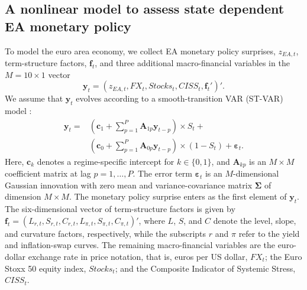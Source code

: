 \subsection{A nonlinear model to assess state dependent EA monetary policy}
To model the euro area economy, we collect EA monetary policy surprises, $z_{EA,t}$, term-structure factors, $\bm{f}_t$, and three additional macro-financial variables in the $M=10 \times 1$ vector
\begin{equation*}
\bm{y}_t = \left(z_{EA,t}, FX_t, Stocks_t, CISS_t, \bm{f}_t'\right)'.
\end{equation*} We assume that $\bm{y}_t$ evolves according to a smooth-transition VAR (ST-VAR) model \citep{terasvirta1992characterizing, weise1999asymmetric, gefang2009nonlinear, hubrich2013STVAR}:
\begin{equation}\label{eq:STVAR}
\begin{aligned}
    \bm{y}_t = &\left(\bm c_{1} + \sum_{p = 1}^{P} \bm{A}_{1p} \bm{y}_{t-p} \right)\times S_t + \\
    &\left(\bm c_{0} + \sum_{p = 1}^{P} \bm{A}_{0p} \bm{y}_{t-p} \right)\times \left(1- S_t \right) + \bm \varepsilon_t.
\end{aligned}
\end{equation}
Here, $\bm{c}_k$ denotes a regime-specific intercept for $k \in \{0,1\}$, and $\bm{A}_{kp}$ is an $M \times M$ coefficient matrix at lag $p=1,\ldots,P$. The error term $\bm{\varepsilon}_t$ is an $M$-dimensional Gaussian innovation with zero mean and variance-covariance matrix $\bm{\Sigma}$ of dimension $M \times M$.
The monetary policy surprise enters as the first element of $\bm{y}_t$. The six-dimensional vector of term-structure factors is given by $\bm{f}_t =
\left(L_{r,t}, S_{r,t}, C_{r,t}, L_{\pi,t}, S_{\pi,t}, C_{\pi,t}\right)'$, where $L$, $S$, and $C$ denote the level, slope, and curvature factors, respectively, while the subscripts $r$ and $\pi$ refer to the yield and inflation-swap curves. The remaining macro-financial variables are the euro-dollar exchange rate in price notation, that is, euros per US dollar, $FX_t$; the Euro Stoxx 50 equity index, $Stocks_t$; and the Composite Indicator of Systemic Stress, $CISS_t$.

